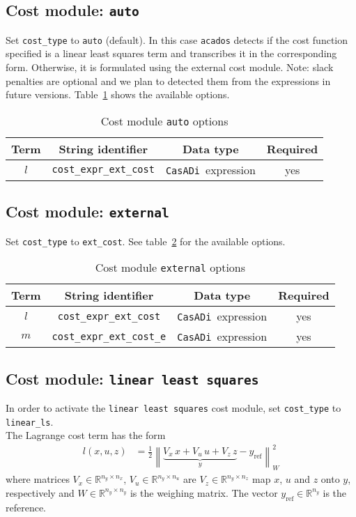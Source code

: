\documentclass[
a4paper, %
10pt, %
notitlepage,
english]{CSUniSchoolLabReport}
\newcommand{\code}[1]{\texttt{#1}}
\newcommand{\casadi}{\texttt{CasADi}}
\newcommand{\acados}{\texttt{acados}}
\newcommand{\norm}[1]{\left\lVert#1\right\rVert}
\newcommand{\ind}[1]{_{\textrm{#1}}}
\newcommand{\mandatory}{yes}
\begin{document}
\begin{appendices}
\subsection{Cost module: \code{auto}}\label{sec:cost:auto}
%
Set \code{cost\_type} to \code{auto} (default).
In this case \acados{} detects if the cost function specified is a linear least squares term and transcribes it in the corresponding form.
Otherwise, it is formulated using the external cost module.
Note: slack penalties are optional and we plan to detected them from the expressions in future versions.
Table~\ref{tab:cost:auto} shows the available options.
%
\begin{table}[h!]
	\centering
	\caption{Cost module \code{auto} options} \label{tab:cost:auto}
	\begin{tabular}{cccc}
		\toprule
		Term & String identifier & Data type & Required \\ \midrule
		$ l $ & \code{cost\_expr\_ext\_cost}    & \casadi~expression   & \mandatory  \\
		\bottomrule
	\end{tabular}
\end{table}
%
\subsection{Cost module: \code{external}}\label{sec:cost:external}
%
Set \code{cost\_type} to \code{ext\_cost}.
See table~\ref{tab:cost:external} for the available options.
\begin{table}[h!]
	\centering
	\caption{Cost module \code{external} options} \label{tab:cost:external}
	\begin{tabular}{cccc}
		\toprule
		Term & String identifier & Data type & Required \\ \midrule
		$ l $ & \code{cost\_expr\_ext\_cost}    & \casadi~expression   & \mandatory  \\
		$ m $ & \code{cost\_expr\_ext\_cost\_e}    & \casadi~expression  & \mandatory \\
		\bottomrule
	\end{tabular}
\end{table}
%
\subsection{Cost module: \code{linear least squares}}\label{sec:cost:linear_ls}
%
In order to activate the \code{linear least squares} cost module, set \code{cost\_type} to \code{linear\_ls}.\\
The Lagrange cost term has the form
\begin{align}
	l(x, u, z) &= \frac{1}{2} \norm{ \underbrace{V_x\, x + V_u\, u + V_z\, z}_{\displaystyle y} - y\ind{ref}}_W^2 \label{eq:cost:linear_ls:l}
\end{align}
where matrices $ V_x \in \mathbb{R}^{n_y \times n_x}$, $V_u \in \mathbb{R}^{n_y \times n_u}$ are $V_z \in \mathbb{R}^{n_y \times n_z}$ map $x$, $u$ and $z$ onto $y$, respectively and $W \in \mathbb{R}^{n_y \times n_y}$ is the weighing matrix. The vector $y\ind{ref} \in \mathbb{R}^{n_y}$ is the reference.


\end{appendices}
\end{document}
